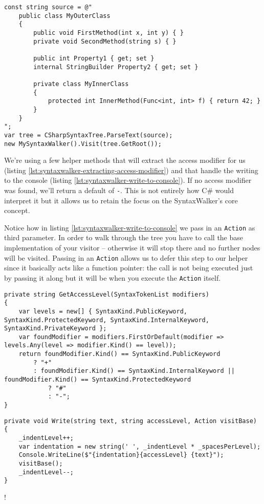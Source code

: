 \begin{lstlisting}[label={lst:syntaxwalker-visiting-from-root}]
const string source = @"
	public class MyOuterClass
	{
	    public void FirstMethod(int x, int y) { }
	    private void SecondMethod(string s) { }
	
	    public int Property1 { get; set }
	    internal StringBuilder Property2 { get; set }
	
	    private class MyInnerClass
	    {
	        protected int InnerMethod(Func<int, int> f) { return 42; }
	    }
	}
";
var tree = CSharpSyntaxTree.ParseText(source);
new MySyntaxWalker().Visit(tree.GetRoot());
\end{lstlisting}

We're using a few helper methods that will extract the access modifier for us (listing \ref{lst:syntaxwalker-extracting-access-modifier}) and that handle the writing to the console (listing \ref{lst:syntaxwalker-write-to-console}). If no access modifier was found, we'll return a default of \texttt{-}. This is not entirely how C\# would interpret it but it allows us to retain the focus on the SyntaxWalker's core concept.

Notice how in listing \ref{lst:syntaxwalker-write-to-console} we pass in an \texttt{Action} as third parameter. In order to walk through the tree you have to call the base implementation of your visitor -- otherwise it will stop there and no further nodes will be visited. Passing in an \texttt{Action} allows us to defer this step to our helper since it basically acts like a function pointer: the call is not being executed just by passing it along but it will be when you execute the \texttt{Action} itself.

\begin{lstlisting}[label={lst:syntaxwalker-extracting-access-modifier}]
private string GetAccessLevel(SyntaxTokenList modifiers)
{
    var levels = new[] { SyntaxKind.PublicKeyword, SyntaxKind.ProtectedKeyword, SyntaxKind.InternalKeyword, SyntaxKind.PrivateKeyword };
    var foundModifier = modifiers.FirstOrDefault(modifier => levels.Any(level => modifier.Kind() == level));
    return foundModifier.Kind() == SyntaxKind.PublicKeyword
		? "+"
		: foundModifier.Kind() == SyntaxKind.InternalKeyword || foundModifier.Kind() == SyntaxKind.ProtectedKeyword
			? "#"
			: "-";
}
\end{lstlisting}

\begin{lstlisting}[label={lst:syntaxwalker-write-to-console}]
private void Write(string text, string accessLevel, Action visitBase)
{
    _indentLevel++;
    var indentation = new string(' ', _indentLevel * _spacesPerLevel);
    Console.WriteLine($"{indentation}{accessLevel} {text}");
    visitBase();
	_indentLevel--;
}
\end{lstlisting}
\ifx{\verb+$+}!\fi %

